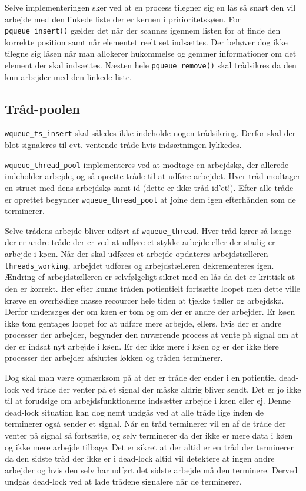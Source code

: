 \documentclass[titlepage]{article}
\begin{document}
    Selve implementeringen sker ved at en process tilegner sig en lås så snart den vil arbejde med den linkede liste der er kernen i pririoritetskøen.
    For {\tt pqueue\_insert()} gælder det når der scannes igennem listen for at finde den korrekte position samt når elementet reelt set indsættes. 
    Der behøver dog ikke tilegne sig låsen når man allokerer hukommelse og gemmer informationer om det element der skal indsættes.
    Næsten hele {\tt pqueue\_remove()} skal trådsikres da den kun arbejder med den linkede liste.

  \subsection{Tråd-poolen}
    {\tt wqueue\_ts\_insert} skal således ikke indeholde nogen trådsikring.
    Derfor skal der blot signaleres til evt. ventende tråde hvis indsætningen lykkedes.

    {\tt wqueue\_thread\_pool} implementeres ved at modtage en arbejdskø, der allerede indeholder arbejde, og så oprette tråde til at udføre arbejdet.
    Hver tråd modtager en struct med dens arbejdskø samt id (dette er ikke tråd id'et!).
    Efter alle tråde er oprettet begynder {\tt wqueue\_thread\_pool} at joine dem igen efterhånden som de terminerer.

    Selve trådens arbejde bliver udført af {\tt wqueue\_thread}.
    Hver tråd kører så længe der er andre tråde der er ved at udføre et stykke arbejde eller der stadig er arbejde i køen.
    Når der skal udføres et arbejde opdateres arbejdstælleren {\tt threads\_working}, arbejdet udføres og arbejdstælleren dekrementeres igen.
    Ændring ef arbejdstælleren er selvfølgeligt sikret med en lås da det er krittisk at den er korrekt.
    Her efter kunne tråden potientielt fortsætte loopet men dette ville kræve en overflødige masse recourcer hele tiden at tjekke tæller og arbejdskø.
    Derfor undersøges der om køen er tom og om der er andre der arbejder.
    Er køen ikke tom gentages loopet for at udføre mere arbejde, ellers, hvis der er andre processer der arbejder, begynder den nuværende process at vente på signal om at der er indsat nyt arbejde i køen.
    Er der ikke mere i køen og er der ikke flere processer der arbejder afsluttes løkken og tråden terminerer.

    Dog skal man være opmærksom på at der er tråde der ender i en potientiel dead-lock ved tråde der venter på et signal der måske aldrig bliver sendt.
    Det er jo ikke til at forudsige om arbejdsfunktionerne indsætter arbejde i køen eller ej.
    Denne dead-lock situation kan dog nemt undgås ved at alle tråde lige inden de terminerer også sender et signal.
    Når en tråd terminerer vil en af de tråde der venter på signal så fortsætte, og selv terminerer da der ikke er mere data i køen og ikke mere arbejde tilbage.
    Det er sikret at der altid er en tråd der terminerer da den sidste tråd der ikke er i dead-lock altid vil detektere at ingen andre arbejder og hvis den selv har udført det sidste arbejde må den terminere.
    Derved undgås dead-lock ved at lade trådene signalere når de terminerer.
\end{document}

